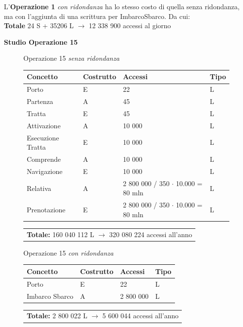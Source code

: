 \documentclass[a4paper, titlepage]{report}
\begin{document}
	\noindent
	L'\textbf{Operazione 1}\textit{ con ridondanza} ha lo stesso costo di quella senza ridondanza, ma con l'aggiunta di una scrittura per ImbarcoSbarco. Da cui: \\ \textbf{Totale} 24 S + 35206 L $\to $ 12 338 900 accessi al giorno

\newpage
\noindent
\textbf{\large{Studio Operazione 15}}
    \begin{figure}[h]
		\centering
		Operazione 15 \textit{senza ridondanza}\\
		\begin{tabular}{L{3cm}C{2.5cm}C{4.5cm}C{2.5cm}}
			\rule[-2mm]{0mm}{0.65cm}{}
			\textbf{Concetto} & \textbf{Costrutto} &\textbf{Accessi} & \textbf{Tipo} \\
			\hline\rule[-2mm]{0mm}{0.65cm}{}
			Porto & E & 22 & L \\
			\hline\rule[-2mm]{0mm}{0.65cm}{}
			Partenza & A & 45 & L \\
			\hline\rule[-2mm]{0mm}{0.65cm}{}
			Tratta & E & 45 & L \\
			\hline\rule[-2mm]{0mm}{0.65cm}{}	
			Attivazione & A & 10 000 & L \\
			\hline\rule[-2mm]{0mm}{0.65cm}{}
			Esecuzione Tratta & E & 10 000 & L \\
			\hline\rule[-2mm]{0mm}{0.65cm}{}
			Comprende & A & 10 000 & L \\
			\hline\rule[-2mm]{0mm}{0.65cm}{}
			Navigazione & E & 10 000 & L \\
			\hline\rule[-2mm]{0mm}{0.65cm}{}
			Relativa & A & 2 800 000 / 350 $\cdot$ 10.000 = 80 mln & L \\
			\hline\rule[-2mm]{0mm}{0.65cm}{}
			Prenotazione & E & 2 800 000 / 350 $\cdot$ 10.000 = 80 mln & L \\
		\end{tabular}
		\begin{tabular}{C{13.9cm}}
			\rule[-4mm]{0mm}{1cm}{}	
			 \textbf{Totale:} 160 040 112 L $\to$ 320 080 224 accessi all'anno
		\end{tabular}
	\end{figure}
	
	\begin{figure}[h]
		\centering
		Operazione 15 \textit{con ridondanza}\\
		\begin{tabular}{C{3cm}C{2.5cm}C{4.5cm}C{2.5cm}}
			\rule[-2mm]{0mm}{0.65cm}{}
			\textbf{Concetto} & \textbf{Costrutto} &\textbf{Accessi} & \textbf{Tipo} \\
			\hline\rule[-2mm]{0mm}{0.65cm}{}
			Porto & E & 22 & L \\
			\hline\rule[-2mm]{0mm}{0.65cm}{}
			Imbarco Sbarco & A & 2 800 000 & L \\
		\end{tabular}
		\begin{tabular}{C{13.9cm}}
			\rule[-4mm]{0mm}{1cm}{}	
			 \textbf{Totale:} 2 800 022 L $\to$ 5 600 044 accessi all'anno
		\end{tabular}
	\end{figure}
\end{document}
